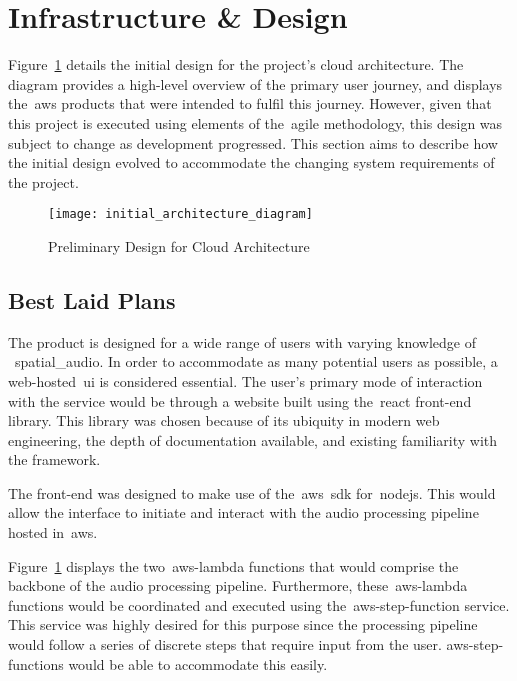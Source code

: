 \thispagestyle{plain}
\newpage
\section{Infrastructure \& Design}\label{sec:infrastructure-design}

\normalsize

Figure~\ref{fig:preliminary-design} details the initial design for the project's cloud architecture.
The diagram provides a high-level overview of the primary user journey,
and displays the~\gls{aws} products that were intended to fulfil this journey.
However, given that this project is executed using elements of the~\gls{agile} methodology,
this design was subject to change as development progressed.
This section aims to describe how the initial design evolved
to accommodate the changing system requirements of the project.

\begin{figure}[!htb]
    \minipage{\textwidth}
    \texttt{[image: initial\_architecture\_diagram]}
    \caption{Preliminary Design for Cloud Architecture}\label{fig:preliminary-design}
    \endminipage\hfill
\end{figure}

\subsection{Best Laid Plans}\label{subsec:best-laid-plans}

The product is designed for a wide range of users with varying knowledge of ~\gls{spatial_audio}.
In order to accommodate as many potential users as possible, a web-hosted~\gls{ui} is considered essential.
The user's primary mode of interaction with the service would be through a website
built using the~\gls{react} front-end library.
This library was chosen because of its ubiquity in modern web engineering, the depth of documentation available,
and existing familiarity with the framework.

The front-end was designed to make use of the~\gls{aws}~\gls{sdk} for~\gls{nodejs}.
This would allow the interface to initiate and interact with the audio processing pipeline hosted in~\gls{aws}.

Figure~\ref{fig:preliminary-design} displays the two~\gls{aws-lambda} functions
that would comprise the backbone of the audio processing pipeline.
Furthermore,
these~\gls{aws-lambda} functions would be coordinated and executed using the~\gls{aws-step-function} service.
This service was highly desired for this purpose
since the processing pipeline would follow a series of discrete steps that require input from the user.
\glspl{aws-step-function} would be able to accommodate this easily.

